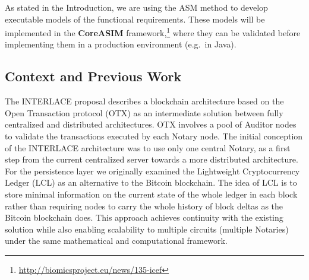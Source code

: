 As stated in the Introduction, we are using the ASM method  \cite{BoergerStaerk2003} to develop executable models of the functional requirements. These models will be implemented in the \textbf{CoreASIM} framework,\footnote{\url{http://biomicsproject.eu/news/135-icef}} where they can be validated before implementing them in a production environment (e.g.\ in Java).

\subsection{Context and Previous Work}
The INTERLACE proposal describes a blockchain architecture based on the Open Transaction protocol (OTX) \cite{Odom} as an intermediate solution between fully centralized and distributed architectures. OTX involves a pool of Auditor nodes to validate the transactions executed by each Notary node. The initial conception of the INTERLACE architecture was to use only one central Notary, as a first step from the current centralized server towards a more distributed architecture. For the persistence layer we originally examined the Lightweight Cryptocurrency Ledger (LCL) \cite{White2015} as an alternative to the Bitcoin blockchain. The idea of LCL is to store minimal information on the current state of the whole ledger in each block rather than requiring nodes to carry the whole history of block deltas as the Bitcoin blockchain does. This approach achieves continuity with the existing solution while also enabling scalability to multiple circuits (multiple Notaries) under the same mathematical and computational framework.

